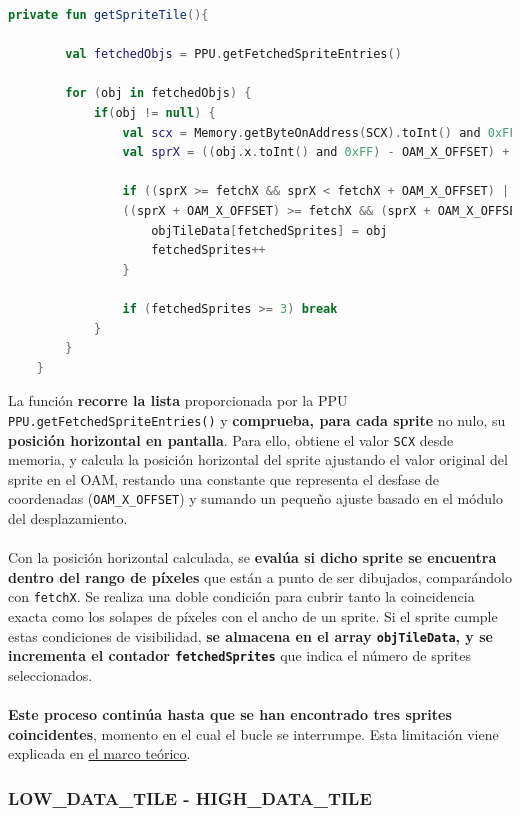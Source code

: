 \begin{lstlisting}[language=Kotlin, caption={FIFO Fetcher - Obtención de Tile de Sprites.}, label={code:ppufifogettileobj}]
    private fun getSpriteTile(){

        val fetchedObjs = PPU.getFetchedSpriteEntries()

        for (obj in fetchedObjs) {
            if(obj != null) {
                val scx = Memory.getByteOnAddress(SCX).toInt() and 0xFF
                val sprX = ((obj.x.toInt() and 0xFF) - OAM_X_OFFSET) + (scx % PIXELS_PER_TILE)

                if ((sprX >= fetchX && sprX < fetchX + OAM_X_OFFSET) ||
                ((sprX + OAM_X_OFFSET) >= fetchX && (sprX + OAM_X_OFFSET) < fetchX + OAM_X_OFFSET)) {
                    objTileData[fetchedSprites] = obj
                    fetchedSprites++
                }

                if (fetchedSprites >= 3) break
            }
        }
    }
\end{lstlisting}

La función \textbf{recorre la lista} proporcionada por la PPU \texttt{PPU.getFetchedSpriteEntries()} y \textbf{comprueba, para cada sprite} no nulo, su \textbf{posición horizontal en pantalla}. Para ello, obtiene el valor \texttt{SCX} desde memoria, y calcula la posición horizontal del sprite ajustando el valor original del sprite en el OAM, restando una constante que representa el desfase de coordenadas (\texttt{OAM\_X\_OFFSET}) y sumando un pequeño ajuste basado en el módulo del desplazamiento.
\\\\
Con la posición horizontal calculada, se \textbf{evalúa si dicho sprite se encuentra dentro del rango de píxeles} que están a punto de ser dibujados, comparándolo con \texttt{fetchX}. Se realiza una doble condición para cubrir tanto la coincidencia exacta como los solapes de píxeles con el ancho de un sprite. Si el sprite cumple estas condiciones de visibilidad, \textbf{se almacena en el array \texttt{objTileData}, y se incrementa el contador \texttt{fetchedSprites}} que indica el número de sprites seleccionados.
\\\\
\textbf{Este proceso continúa hasta que se han encontrado tres sprites coincidentes}, momento en el cual el bucle se interrumpe. Esta limitación viene explicada en \hyperref[mem:oam]{el marco teórico}.

\subsubsection{LOW\_DATA\_TILE - HIGH\_DATA\_TILE}

